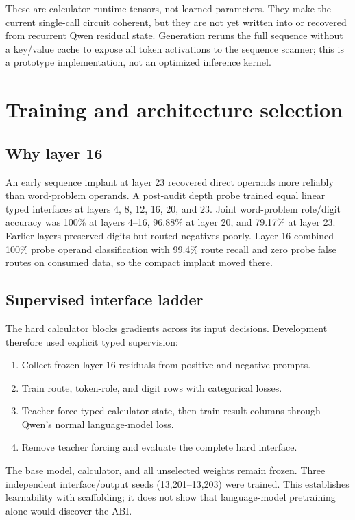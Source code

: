 \documentclass[11pt]{article}
\begin{document}
These are calculator-runtime tensors, not learned parameters. They make the
current single-call circuit coherent, but they are not yet written into or
recovered from recurrent Qwen residual state. Generation reruns the full
sequence without a key/value cache to expose all token activations to the
sequence scanner; this is a prototype implementation, not an optimized
inference kernel.

\section{Training and architecture selection}

\subsection{Why layer 16}

An early sequence implant at layer 23 recovered direct operands more reliably
than word-problem operands. A post-audit depth probe trained equal linear typed
interfaces at layers 4, 8, 12, 16, 20, and 23. Joint word-problem role/digit
accuracy was 100\% at layers 4--16, 96.88\% at layer 20, and 79.17\% at layer
23. Earlier layers preserved digits but routed negatives poorly. Layer 16
combined 100\% probe operand classification with 99.4\% route recall and zero
probe false routes on consumed data, so the compact implant moved there.

\subsection{Supervised interface ladder}

The hard calculator blocks gradients across its input decisions. Development
therefore used explicit typed supervision:

\begin{enumerate}
\item Collect frozen layer-16 residuals from positive and negative prompts.
\item Train route, token-role, and digit rows with categorical losses.
\item Teacher-force typed calculator state, then train result columns through
      Qwen's normal language-model loss.
\item Remove teacher forcing and evaluate the complete hard interface.
\end{enumerate}

The base model, calculator, and all unselected weights remain frozen. Three
independent interface/output seeds (13,201--13,203) were trained. This
establishes learnability with scaffolding; it does not show that language-model
pretraining alone would discover the ABI.
\end{document}
